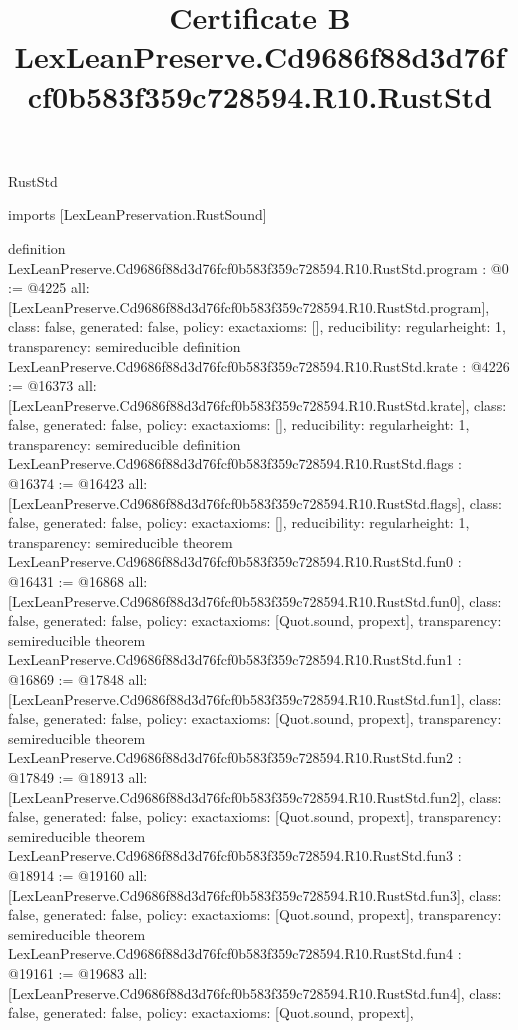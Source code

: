 \begin{lexlean}{RustStd}
\title{Certificate B LexLeanPreserve.Cd9686f88d3d76fcf0b583f359c728594.R10.RustStd}
\begin{coremodule}
imports [LexLeanPreservation.RustSound]

definition LexLeanPreserve.Cd9686f88d3d76fcf0b583f359c728594.R10.RustStd.program : @0 := @4225 {
  all: [LexLeanPreserve.Cd9686f88d3d76fcf0b583f359c728594.R10.RustStd.program],
  class: false,
  generated: false,
  policy: exact{axioms: []},
  reducibility: regular{height: 1},
  transparency: semireducible
}
definition LexLeanPreserve.Cd9686f88d3d76fcf0b583f359c728594.R10.RustStd.krate : @4226 := @16373 {
  all: [LexLeanPreserve.Cd9686f88d3d76fcf0b583f359c728594.R10.RustStd.krate],
  class: false,
  generated: false,
  policy: exact{axioms: []},
  reducibility: regular{height: 1},
  transparency: semireducible
}
definition LexLeanPreserve.Cd9686f88d3d76fcf0b583f359c728594.R10.RustStd.flags : @16374 := @16423 {
  all: [LexLeanPreserve.Cd9686f88d3d76fcf0b583f359c728594.R10.RustStd.flags],
  class: false,
  generated: false,
  policy: exact{axioms: []},
  reducibility: regular{height: 1},
  transparency: semireducible
}
theorem LexLeanPreserve.Cd9686f88d3d76fcf0b583f359c728594.R10.RustStd.fun0 : @16431 := @16868 {
  all: [LexLeanPreserve.Cd9686f88d3d76fcf0b583f359c728594.R10.RustStd.fun0],
  class: false,
  generated: false,
  policy: exact{axioms: [Quot.sound, propext]},
  transparency: semireducible
}
theorem LexLeanPreserve.Cd9686f88d3d76fcf0b583f359c728594.R10.RustStd.fun1 : @16869 := @17848 {
  all: [LexLeanPreserve.Cd9686f88d3d76fcf0b583f359c728594.R10.RustStd.fun1],
  class: false,
  generated: false,
  policy: exact{axioms: [Quot.sound, propext]},
  transparency: semireducible
}
theorem LexLeanPreserve.Cd9686f88d3d76fcf0b583f359c728594.R10.RustStd.fun2 : @17849 := @18913 {
  all: [LexLeanPreserve.Cd9686f88d3d76fcf0b583f359c728594.R10.RustStd.fun2],
  class: false,
  generated: false,
  policy: exact{axioms: [Quot.sound, propext]},
  transparency: semireducible
}
theorem LexLeanPreserve.Cd9686f88d3d76fcf0b583f359c728594.R10.RustStd.fun3 : @18914 := @19160 {
  all: [LexLeanPreserve.Cd9686f88d3d76fcf0b583f359c728594.R10.RustStd.fun3],
  class: false,
  generated: false,
  policy: exact{axioms: [Quot.sound, propext]},
  transparency: semireducible
}
theorem LexLeanPreserve.Cd9686f88d3d76fcf0b583f359c728594.R10.RustStd.fun4 : @19161 := @19683 {
  all: [LexLeanPreserve.Cd9686f88d3d76fcf0b583f359c728594.R10.RustStd.fun4],
  class: false,
  generated: false,
  policy: exact{axioms: [Quot.sound, propext]},
}
\end{coremodule}
\end{lexlean}
